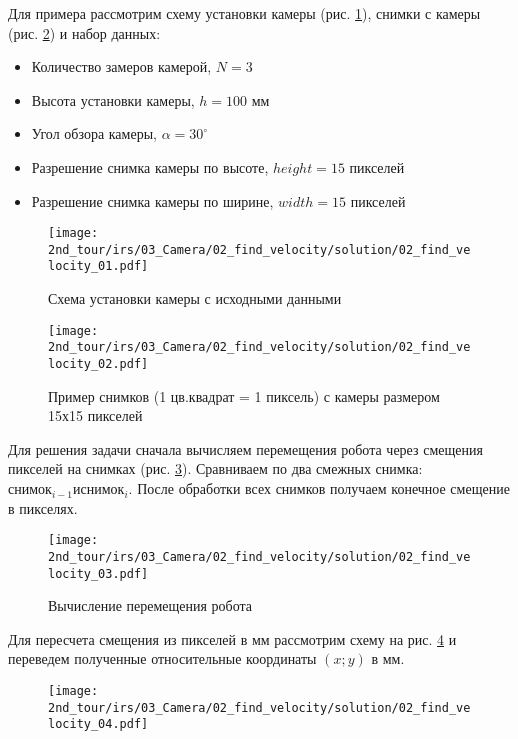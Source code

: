 \solutionSection

Для примера рассмотрим схему установки камеры (рис. \ref{fig:02_find_velocity_01}), снимки с камеры (рис. \ref{fig:02_find_velocity_02}) и набор данных:
\begin{itemize}
	\item Количество замеров камерой, $N = 3$
	\item Высота установки камеры, $h = 100$ мм
	\item Угол обзора камеры, $\alpha = 30^\circ$
	\item Разрешение снимка камеры по высоте, $height = 15$ пикселей
	\item Разрешение снимка камеры по ширине, $width = 15$ пикселей
\end{itemize}

\begin{figure}[h!]
	\centering
	\texttt{[image: 2nd\_tour/irs/03\_Camera/02\_find\_velocity/solution/02\_find\_velocity\_01.pdf]}
	\caption{Схема установки камеры с исходными данными}
	\label{fig:02_find_velocity_01}
\end{figure}

\begin{figure}[h!]
	\centering
	\texttt{[image: 2nd\_tour/irs/03\_Camera/02\_find\_velocity/solution/02\_find\_velocity\_02.pdf]}
	\caption{Пример снимков (1 цв.квадрат = 1 пиксель) с камеры размером 15х15 пикселей}
	\label{fig:02_find_velocity_02}
\end{figure}

Для решения задачи сначала вычисляем перемещения робота через смещения пикселей на снимках (рис. \ref{fig:02_find_velocity_03}). Сравниваем по два смежных снимка: $снимок_{i-1} и снимок_i$. После обработки всех снимков получаем конечное смещение в пикселях.

\begin{figure}[h!]
	\centering
	\texttt{[image: 2nd\_tour/irs/03\_Camera/02\_find\_velocity/solution/02\_find\_velocity\_03.pdf]}
	\caption{Вычисление перемещения робота}
	\label{fig:02_find_velocity_03}
\end{figure}

\newpage

Для пересчета смещения из пикселей в мм рассмотрим схему на рис. \ref{fig:02_find_velocity_04} и переведем полученные относительные координаты $(x; y)$ в мм.

\begin{figure}[h!]
	\center
	\texttt{[image: 2nd\_tour/irs/03\_Camera/02\_find\_velocity/solution/02\_find\_velocity\_04.pdf]}
	\caption{}
	\label{fig:02_find_velocity_04}
\end{figure}


